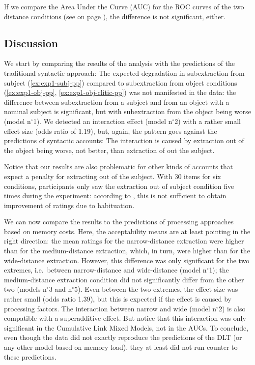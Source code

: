 If we compare the Area Under the Curve (AUC) for the ROC curves of the two distance conditions (see  on page \pageref{fig:exp01-ROC}), the difference is not significant, either.

\subsection{Discussion}

We start by comparing the results of the analysis with the predictions of the traditional syntactic approach: The expected degradation in subextraction from subject (\ref{ex:exp1-subj-pp}) compared to subextraction from object conditions (\ref{ex:exp1-obj-pp}, \ref{ex:exp1-obj-clitic-pp}) was not manifested in the data: the difference between subextraction from a subject and from an object with a nominal subject is significant, but with subextraction from the object being worse (model n$^{\circ}$1). We detected an interaction effect (model n$^{\circ}$2) with a rather small effect size (odds ratio of 1.19), but, again, the pattern goes against the predictions of syntactic accounts: The interaction is caused by extraction out of the object being worse, not better, than extraction of out the subject.

Notice that our results are also problematic for other kinds of accounts that expect a penalty for extracting out of the subject. With 30 items for six conditions, participants only saw the extraction out of subject condition five times during the experiment: according to \citet{Chaves.2019.Frequency}, this is not sufficient to obtain improvement of ratings due to habituation. 

We can now compare the results to the predictions of processing approaches based on memory costs. Here, the acceptability means are at least pointing in the right direction: the mean ratings for the narrow-distance extraction were higher than for the medium-distance extraction, which, in turn, were higher than for the wide-distance extraction. However, this difference was only significant for the two extremes, i.e.\ between narrow-distance and wide-distance (model n$^{\circ}$1); the medium-distance extraction condition did not significantly differ from the other two (models n$^{\circ}$3 and  n$^{\circ}$5). Even between the two extremes, the effect size was rather small (odds ratio 1.39), but this is expected if the effect is caused by processing factors. The interaction between narrow and wide (model n$^{\circ}$2) is also compatible with a superadditive effect. But notice that this interaction was only significant in the Cumulative Link Mixed Models, not in the AUCs. To conclude, even though the data did not exactly reproduce the predictions of the DLT (or any other model based on memory load), they at least did not run counter to these predictions. 

